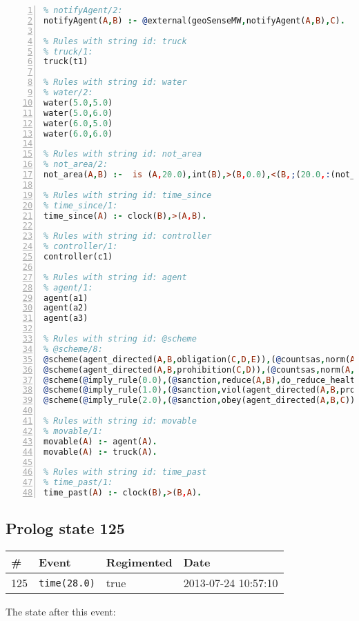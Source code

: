 \documentclass[11pt]{article}\usepackage[utf8]{inputenc}\usepackage{geometry}
\begin{document}
\begin{lstlisting}[language=Prolog, numbers=left]
% Rules with string id: notifyAgent
% notifyAgent/2:
notifyAgent(A,B) :- @external(geoSenseMW,notifyAgent(A,B),C).

% Rules with string id: truck
% truck/1:
truck(t1)

% Rules with string id: water
% water/2:
water(5.0,5.0)
water(5.0,6.0)
water(6.0,5.0)
water(6.0,6.0)

% Rules with string id: not_area
% not_area/2:
not_area(A,B) :-  is (A,20.0),int(B),>(B,0.0),<(B,;(20.0,:(not_area(A,B), is (-(B),20.0)))),int(A),>(A,0.0),<(A,;(20.0,:(area(A,B),-(int(A))))),int(B),>(A,0.0),>(B,0.0),<(A,21.0),<(B,21.0).

% Rules with string id: time_since
% time_since/1:
time_since(A) :- clock(B),>(A,B).

% Rules with string id: controller
% controller/1:
controller(c1)

% Rules with string id: agent
% agent/1:
agent(a1)
agent(a2)
agent(a3)

% Rules with string id: @scheme
% @scheme/8:
@scheme(agent_directed(A,B,obligation(C,D,E)),(@countsas,norm(A,B,F,obligation(C,D,E)),F),false,(listTrue(C)),(time_past(D)),false,[plus(viol(agent_directed(A,B,obligation(C,D,E))))|[]],[plus(obey(agent_directed(A,B,obligation(C,D,E))))|[]])
@scheme(agent_directed(A,B,prohibition(C,D)),(@countsas,norm(A,B,E,prohibition(C,D)),E),(listTrue(C)),false,(false),false,[plus(viol(agent_directed(A,B,prohibition(C,D))))|[]],[plus(obey(agent_directed(A,B,prohibition(C,D))))|[]])
@scheme(@imply_rule(0.0),(@sanction,reduce(A,B),do_reduce_health(A,B),notifyAgent(A,changed(status))),true,false,false,false,[min(reduce(A,B))|[]],[])
@scheme(@imply_rule(1.0),(@sanction,viol(agent_directed(A,B,prohibition(C,D))),do_sanction(D)),true,false,false,false,[min(viol(agent_directed(A,B,prohibition(C,D))))|[]],[])
@scheme(@imply_rule(2.0),(@sanction,obey(agent_directed(A,B,C))),true,false,false,false,[min(obey(agent_directed(A,B,C)))|[]],[])

% Rules with string id: movable
% movable/1:
movable(A) :- agent(A).
movable(A) :- truck(A).

% Rules with string id: time_past
% time_past/1:
time_past(A) :- clock(B),>(B,A).

\end{lstlisting}
\clearpage 
\subsection{Prolog state 125}
\begin{table}[ht]
\centering 
\begin{tabular}{l l l l} 
\textbf{\#} & \textbf{Event} & \textbf{Regimented} & \textbf{Date} \\ [0.5ex] 
\hline
125&\texttt{time(28.0)}&true&2013-07-24 10:57:10\\ [1ex] \hline\end{tabular}
\end{table}
The state after this event:
\end{document}
